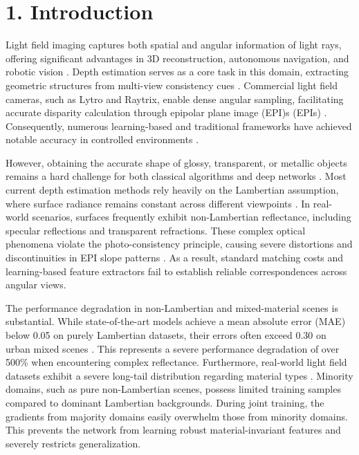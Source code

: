 \documentclass[lettersize,journal]{IEEEtran}
\begin{document}
\section{1. Introduction}

Light field imaging captures both spatial and angular information of light rays, offering significant advantages in 3D reconstruction, autonomous navigation, and robotic vision \cite{lightlight}. Depth estimation serves as a core task in this domain, extracting geometric structures from multi-view consistency cues \cite{depthdepth}. Commercial light field cameras, such as Lytro and Raytrix, enable dense angular sampling, facilitating accurate disparity calculation through epipolar plane image (EPI)s (EPIs) \cite{lytrolytro}. Consequently, numerous learning-based and traditional frameworks have achieved notable accuracy in controlled environments \cite{learninglearn}.

However, obtaining the accurate shape of glossy, transparent, or metallic objects remains a hard challenge for both classical algorithms and deep networks \cite{glossygloss}. Most current depth estimation methods rely heavily on the Lambertian assumption, where surface radiance remains constant across different viewpoints \cite{lambertian}. In real-world scenarios, surfaces frequently exhibit non-Lambertian reflectance, including specular reflections and transparent refractions. These complex optical phenomena violate the photo-consistency principle, causing severe distortions and discontinuities in EPI slope patterns \cite{specularspecu}. As a result, standard matching costs and learning-based feature extractors fail to establish reliable correspondences across angular views.

The performance degradation in non-Lambertian and mixed-material scenes is substantial. While state-of-the-art models achieve a mean absolute error (MAE) below 0.05 on purely Lambertian datasets, their errors often exceed 0.30 on urban mixed scenes \cite{urbanurban}. This represents a severe performance degradation of over 500\% when encountering complex reflectance. Furthermore, real-world light field datasets exhibit a severe long-tail distribution regarding material types . Minority domains, such as pure non-Lambertian scenes, possess limited training samples compared to dominant Lambertian backgrounds. During joint training, the gradients from majority domains easily overwhelm those from minority domains. This prevents the network from learning robust material-invariant features and severely restricts generalization.
\end{document}
